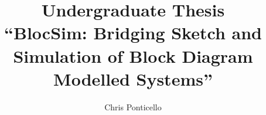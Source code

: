 
\hypersetup{pageanchor=true}

\title{Undergraduate Thesis\\ \vspace{0.5 cm} ``BlocSim: Bridging Sketch and Simulation of Block Diagram Modelled Systems'' }
\author{Chris Ponticello}

\renewcommand{\degreetext}{in partial fulfilment of the Degree Bachelor of Engineering\\ in the
discipline of Computer Systems Engineering}

\frontmatter

\titlepage
